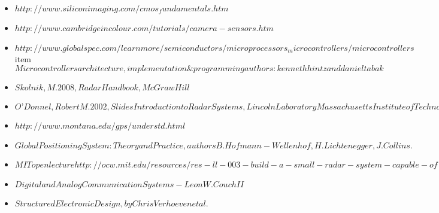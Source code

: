 \documentclass{article}
\begin{document}
\begin{itemize}
\item
$http://www.siliconimaging.com/cmos_fundamentals.htm$
\item
$http://www.cambridgeincolour.com/tutorials/camera-sensors.htm$
\item
$http://www.globalspec.com/learnmore/semiconductors/microprocessors_microcontrollers/microcontrollers$
item
$Microcontrollers architecture, implementation \& programming 
authors : kenneth hintz and daniel tabak$
\item
$ Skolnik, M. 2008, Radar Handbook, McGraw Hill$
\item
$ O’Donnel, Robert M. 2002, Slides Introduction to Radar Systems, Lincoln Laboratory Massachusetts Institute of Technology$
\item
$http://www.montana.edu/gps/understd.html$
\item
$Global Positioning System: Theory and Practice ,authors  B. Hofmann-Wellenhof,H. Lichtenegger,J. Collins.$
\item
$ MIT open lecture http://ocw.mit.edu/resources/res-ll-003-build-a-small-radar-system-capable-of-sensing-range-doppler-and-synthetic-aperture-radar-imaging-january-iap-2011/lecture-notes/MITRES_LL_003IAP11_lec03.pdf $
\item
$Digital and Analog Communication Systems - Leon W. Couch II$
\item
$Structured Electronic Design, by Chris Verhoeven et al.$
\end{itemize}
\end{document}
